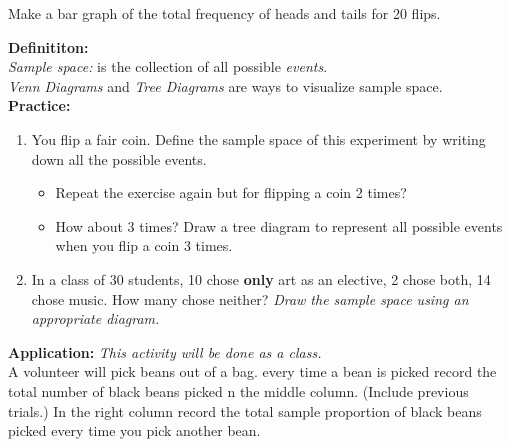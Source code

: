 \documentclass[12pt]{article}
\begin{document}
Make a bar graph of the total frequency of heads and tails for 20 flips. \\
\vspace{10em}

\textbf{Definititon:}\\

\textit{Sample space:}  is the collection of all possible \textit{events}. \\

\textit{Venn Diagrams} and \textit{ Tree Diagrams} are ways to visualize sample space.
\\

\textbf{Practice:}

\begin{enumerate}
\item You flip a fair coin. Define the sample space of this experiment by writing down all the possible events.\\

\begin{itemize}
 \item Repeat the exercise again but for flipping a coin 2 times?\\
 \vspace{2em}
 
 \item How about 3 times? Draw a tree diagram to represent all possible events when you flip a coin 3 times.\\
\vspace{7em}

  \end{itemize}
  
\item In a class of 30 students, 10 chose \textbf{only} art as an elective, 2 chose both, 14 chose music. How many chose neither?
\textit{Draw the sample space using an appropriate diagram.}\\ 
\vspace{5em}

 \end{enumerate}

\clearpage

\textbf{Application:} \textit{This activity will be done as a class.} \\ [12pt]

A volunteer will pick beans out of a bag. every time a bean is picked record the total number of black beans picked n the middle column. (Include previous trials.) In the right column record the total sample proportion of black beans picked every time you pick another bean. \\
\end{document}
